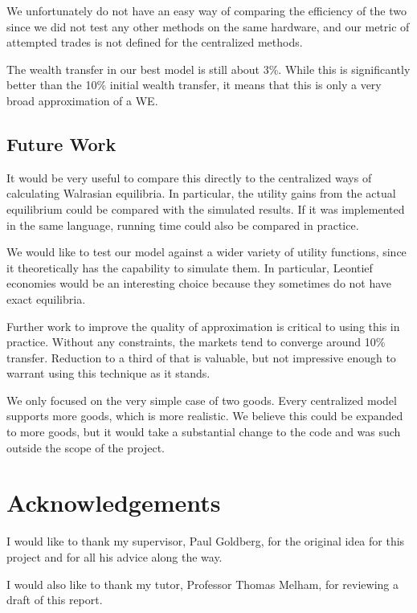 \documentclass[12pt,a4paper,titlepage]{article}
\begin{document}
We unfortunately do not have an easy way of comparing the efficiency of the two since we did not test any other methods on the same hardware, and our metric of attempted trades is not defined for the centralized methods.

The wealth transfer in our best model is still about 3\%.
While this is significantly better than the 10\% initial wealth transfer, it means that this is only a very broad approximation of a WE.





\subsection{Future Work}
It would be very useful to compare this directly to the centralized ways of calculating Walrasian equilibria.
In particular, the utility gains from the actual equilibrium could be compared with the simulated results.
If it was implemented in the same language, running time could also be compared in practice.

We would like to test our model against a wider variety of utility functions, since it theoretically has the capability to simulate them.
In particular, Leontief economies would be an interesting choice because they sometimes do not have exact equilibria.

Further work to improve the quality of approximation is critical to using this in practice.
Without any constraints, the markets tend to converge around 10\% transfer. 
Reduction to a third of that is valuable, but not impressive enough to warrant using this technique as it stands.

We only focused on the very simple case of two goods.
Every centralized model supports more goods, which is more realistic.
We believe this could be expanded to more goods, but it would take a substantial change to the code and was such outside the scope of the project.



\section{Acknowledgements}\label{acknowledgements}
I would like to thank my supervisor, Paul Goldberg, for the original idea for this project and for all his advice along the way.

I would also like to thank my tutor, Professor Thomas Melham, for reviewing a draft of this report.

\printbibliography

\end{document}
